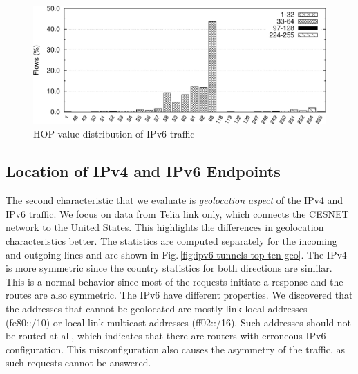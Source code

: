 \begin{figure}[!tb]
        \centering
        \includegraphics[width=1.00\linewidth]{figures/paper-tunnels/ttl/native-hop}
        \caption{HOP value distribution of IPv6 traffic}
        \label{fig:ipv6-tunnels-ipv6-native-hop}
\end{figure}


\subsection{Location of IPv4 and IPv6 Endpoints}
The second characteristic that we evaluate is \textit{geolocation aspect} of the IPv4 and IPv6 traffic. We focus on data from Telia link only, which connects the CESNET network to the United States. This highlights the differences in geolocation characteristics better. The statistics are computed separately for the incoming and outgoing lines and are shown in Fig.\,\ref{fig:ipv6-tunnels-top-ten-geo}. The IPv4 is more symmetric since the country statistics for both directions are similar. This is a normal behavior since most of the requests initiate a response and the routes are also symmetric. The IPv6 have different properties. We discovered that the addresses that cannot be geolocated are mostly link-local addresses (fe80::/10) or local-link multicast addresses (ff02::/16). Such addresses should not be routed at all, which indicates that there are routers with erroneous IPv6 configuration. This misconfiguration also causes the asymmetry of the traffic, as such requests cannot be answered.

